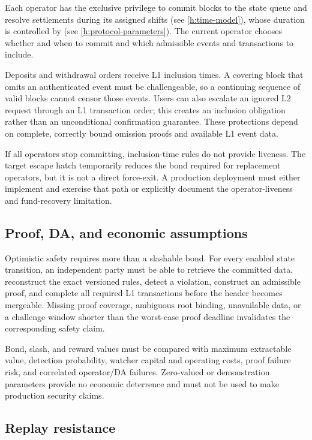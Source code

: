 \documentclass[../midgard.tex]{subfiles}
\begin{document}
Each operator has the exclusive privilege to commit blocks to the state queue and resolve settlements during its assigned shifts (see \cref{h:time-model}), whose duration is controlled by  (see \cref{h:protocol-parameters}).
The current operator chooses whether and when to commit and which admissible events and transactions to include.

Deposits and withdrawal orders receive L1 inclusion times.
A covering block that omits an authenticated event must be challengeable, so a continuing sequence of valid blocks cannot censor those events.
Users can also escalate an ignored L2 request through an L1 transaction order; this creates an inclusion obligation rather than an unconditional confirmation guarantee.
These protections depend on complete, correctly bound omission proofs and available L1 event data.

If all operators stop committing, inclusion-time rules do not provide liveness.
The target escape hatch temporarily reduces the bond required for replacement operators, but it is not a direct force-exit.
A production deployment must either implement and exercise that path or explicitly document the operator-liveness and fund-recovery limitation.

\subsection{Proof, DA, and economic assumptions}

Optimistic safety requires more than a slashable bond.
For every enabled state transition, an independent party must be able to retrieve the committed data, reconstruct the exact versioned rules, detect a violation, construct an admissible proof, and complete all required L1 transactions before the header becomes mergeable.
Missing proof coverage, ambiguous root binding, unavailable data, or a challenge window shorter than the worst-case proof deadline invalidates the corresponding safety claim.

Bond, slash, and reward values must be compared with maximum extractable value, detection probability, watcher capital and operating costs, proof failure risk, and correlated operator/DA failures.
Zero-valued or demonstration parameters provide no economic deterrence and must not be used to make production security claims.

\subsection{Replay resistance}
\label{h:replay-attack}
\end{document}
